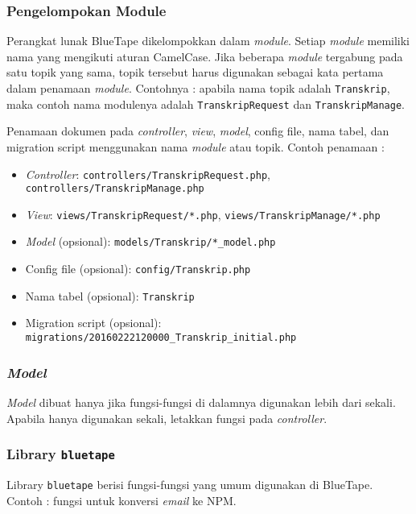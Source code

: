 	\subsubsection{Pengelompokan Module}
		Perangkat lunak BlueTape dikelompokkan dalam \textit{module}. Setiap \textit{module} memiliki nama yang mengikuti aturan CamelCase. Jika beberapa \textit{module} tergabung pada satu topik yang sama, topik tersebut harus digunakan sebagai kata pertama dalam penamaan \textit{module}. Contohnya : apabila nama topik adalah \texttt{Transkrip}, maka contoh nama modulenya adalah \texttt{TranskripRequest} dan \texttt{TranskripManage}.
		
		Penamaan dokumen pada \textit{controller}, \textit{view}, \textit{model}, config file, nama tabel, dan migration script menggunakan nama \textit{module} atau topik. Contoh penamaan :
		\begin{itemize}
			\item \textit{Controller}: \texttt{controllers/TranskripRequest.php}, \texttt{controllers/TranskripManage.php}
			\item \textit{View}: \texttt{views/TranskripRequest/*.php}, \texttt{views/TranskripManage/*.php}
			\item \textit{Model} (opsional): \texttt{models/Transkrip/*\_model.php}
			\item Config file (opsional): \texttt{config/Transkrip.php}
			\item Nama tabel (opsional): \texttt{Transkrip}
			\item Migration script (opsional): \texttt{migrations/20160222120000\_Transkrip\_initial.php}
		\end{itemize} 
	
	\subsubsection{\textit{Model}}
		\textit{Model} dibuat hanya jika fungsi-fungsi di dalamnya digunakan lebih dari sekali. Apabila hanya digunakan sekali, letakkan fungsi pada \textit{controller}.
	
	\subsubsection{Library \texttt{bluetape}}
		Library \texttt{bluetape} berisi fungsi-fungsi yang umum digunakan di BlueTape. Contoh : fungsi untuk konversi \textit{email} ke NPM.
	

